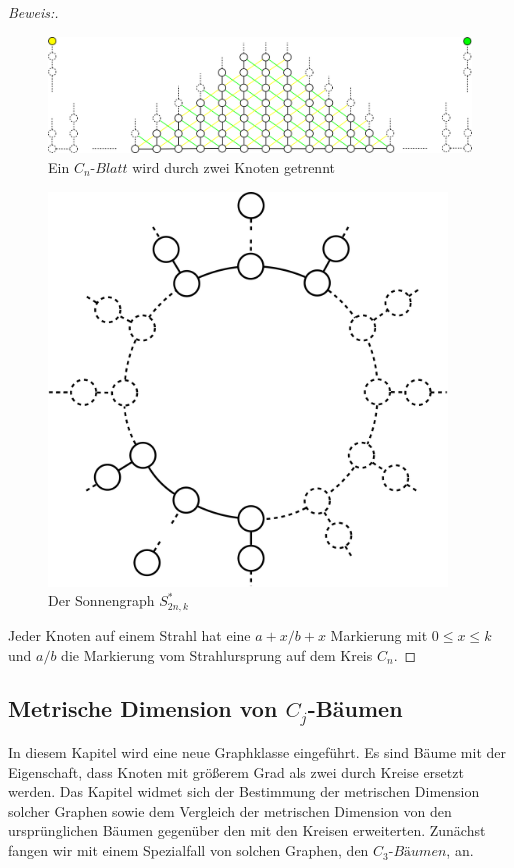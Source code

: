 \begin{proof}[Beweis:]
\begin{figure}[h!]
		\centering
 		 \includegraphics[width=430pt]{bilder/sonne1.pdf}
   \caption{Ein $C_{n}$-$Blatt$ wird durch zwei Knoten getrennt}
  	 \end{figure}
  	 
  	 \begin{figure}[h!]
		\centering
 		 \includegraphics[width=300pt]{bilder/sonne2.pdf}
   \caption{Der Sonnengraph $S^*_{2n,k}$}
  	 \end{figure}
  	 Jeder Knoten auf einem Strahl hat eine $a+x/b+x$ Markierung mit $0 \leq x \leq k$ und $a/b$ die Markierung vom Strahlursprung auf dem Kreis $C_n$.
\end{proof}  	 
\clearpage
\subsection{Metrische Dimension von $C_j$-Bäumen}
In diesem Kapitel wird eine neue Graphklasse eingeführt. Es sind Bäume mit der Eigenschaft, dass Knoten mit größerem Grad als zwei durch Kreise ersetzt werden. Das Kapitel widmet sich der Bestimmung der metrischen Dimension solcher Graphen sowie dem Vergleich der metrischen Dimension von den ursprünglichen Bäumen gegenüber den mit den Kreisen erweiterten. Zunächst fangen wir mit einem Spezialfall von solchen Graphen, den $C_3$-$Bäumen$, an.
